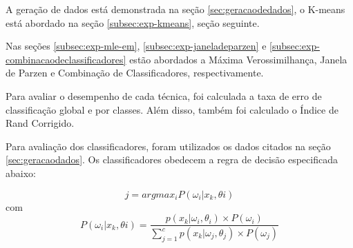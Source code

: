 

A geração de dados está demonstrada na seção \ref{sec:geracaodedados}, o K-means está abordado na seção \ref{subsec:exp-kmeans}, seção seguinte.

Nas seções \ref{subsec:exp-mle-em}, \ref{subsec:exp-janeladeparzen} e \ref{subsec:exp-combinacaodeclassificadores} estão abordados a Máxima Verossimilhança, Janela de Parzen e Combinação de Classificadores, respectivamente.

Para avaliar o desempenho de cada técnica, foi calculada a taxa de erro de classificação global e por classes. Além disso, também foi calculado o Índice de Rand Corrigido.

Para avaliação dos classificadores, foram utilizados os dados citados na seção \ref{sec:geracaodados}. Os classificadores obedecem a regra de decisão especificada abaixo:

\begin{equation}
j = argmax_i P(\omega_{i} | x_{k},\theta{i})
\end{equation}
com
\begin{equation}
P(\omega_{i} | x_{k},\theta{i}) = \dfrac{p(x_k| \omega_i, \theta_i) \times P(\omega_i)}{\sum_{j=1}^c p(x_k | \omega_j, \theta_j) \times P(\omega_j)}
\end{equation}

